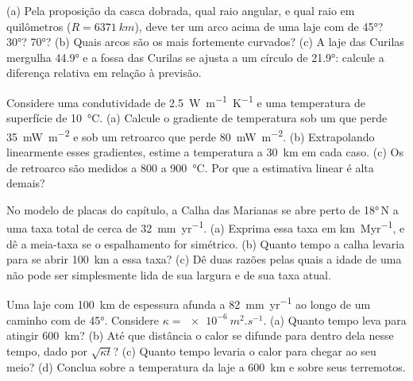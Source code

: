 \begin{exercise}[$\star\star$]\label{exo:b1:active-margins:7}
(a) Pela proposição da casca dobrada, qual raio angular, e qual raio em quilômetros ($R = \qty{6371}{km}$), deve ter um arco acima de uma laje com  de \ang{45}? \ang{30}? \ang{70}? (b) Quais arcos são os mais fortemente curvados? (c) A laje das Curilas mergulha \ang{44.9} e a fossa das Curilas se ajusta a um círculo de \ang{21.9}: calcule a diferença relativa em relação à previsão.
\end{exercise}

\begin{exercise}[$\star\star$]\label{exo:b1:active-margins:8}
Considere uma condutividade de \qty{2.5}{W.m^{-1}.K^{-1}} e uma temperatura de superfície de \qty{10}{\celsius}. (a) Calcule o gradiente de temperatura sob um  que perde \qty{35}{mW.m^{-2}} e sob um retroarco que perde \qty{80}{mW.m^{-2}}. (b) Extrapolando linearmente esses gradientes, estime a temperatura a \qty{30}{km} em cada caso. (c) Os  de retroarco são medidos a 800 a \qty{900}{\celsius}. Por que a estimativa linear é alta demais?
\end{exercise}

\begin{exercise}[$\star\star$]\label{exo:b1:active-margins:9}
No modelo de placas do capítulo, a Calha das Marianas se abre perto de \ang{18}\,N a uma taxa total de cerca de \qty{32}{mm.yr^{-1}}. (a) Exprima essa taxa em \unit{km.Myr^{-1}}, e dê a meia-taxa se o espalhamento for simétrico. (b) Quanto tempo a calha levaria para se abrir \qty{100}{km} a essa taxa? (c) Dê duas razões pelas quais a idade de uma  não pode ser simplesmente lida de sua largura e de sua taxa atual.
\end{exercise}

\begin{exercise}[$\star\star\star$]\label{exo:b1:active-margins:10}
Uma laje com \qty{100}{km} de espessura afunda a \qty{82}{mm.yr^{-1}} ao longo de um caminho com  de \ang{45}. Considere $\kappa = \qty{e-6}{m^2.s^{-1}}$. (a) Quanto tempo leva para atingir \qty{600}{km}? (b) Até que distância o calor se difunde para dentro dela nesse tempo, dado por $\sqrt{\kappa t}$? (c) Quanto tempo levaria o calor para chegar ao seu meio? (d) Conclua sobre a temperatura da laje a \qty{600}{km} e sobre seus terremotos.
\end{exercise}

